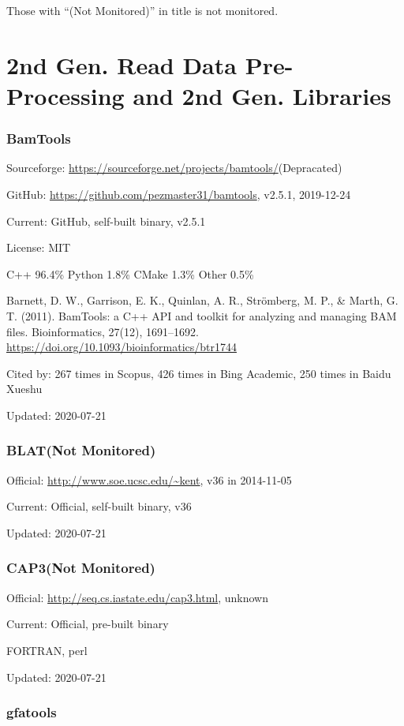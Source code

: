 \documentclass[]{article}
\newcommand{\nm}{{\color{red}(Not Monitored)}}
\newcommand{\de}{{\color{red}(Depracated)}}
\newcommand{\cb}[3]{\par Cited by: {\color{blue}\Huge #1} times in Scopus, {\color{blue}\Huge #2} times in Bing Academic, {\color{blue}\Huge #3} times in Baidu Xueshu}
\begin{document}
Those with ``\nm'' in title is not monitored.

\tableofcontents

\part{2nd Gen. Read Data Pre-Processing and 2nd Gen. Libraries}

\section{BamTools}

Sourceforge: \url{https://sourceforge.net/projects/bamtools/}\de

GitHub: \url{https://github.com/pezmaster31/bamtools}, v2.5.1, 2019-12-24

Current: GitHub, self-built binary, v2.5.1

License: MIT

C++ 96.4\% Python 1.8\% CMake 1.3\% Other 0.5\%

Barnett, D. W., Garrison, E. K., Quinlan, A. R., Strömberg, M. P., \& Marth, G. T. (2011). BamTools: a C++ API and toolkit for analyzing and managing BAM files. Bioinformatics, 27(12), 1691–1692. \url{https://doi.org/10.1093/bioinformatics/btr1744}\cb{267}{426}{250}

Updated: 2020-07-21

\section{BLAT\nm}

Official: \url{http://www.soe.ucsc.edu/~kent}, v36 in 2014-11-05

Current: Official, self-built binary, v36

Updated: 2020-07-21

\section{CAP3\nm}

Official: \url{http://seq.cs.iastate.edu/cap3.html}, unknown

Current: Official, pre-built binary

FORTRAN, perl

Updated: 2020-07-21

\section{gfatools}
\end{document}
